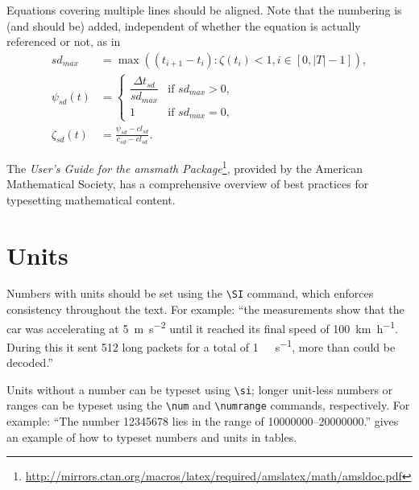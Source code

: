 \documentclass[]{nsm-thesis}
\begin{document}
Equations covering multiple lines should be aligned.
Note that the numbering is (and should be) added, independent of whether the equation is actually referenced or not, as in
\begin{align}
sd_{max} &=
    \max\left(
        (t_{i+1} - t_i)
            : \zeta(t_i) < 1, i \in [0, |T|-1]
    \right)
,\\
\psi_{sd}(t) &=
    \begin{cases}
        \dfrac{\Delta t_{sd}}{sd_{max}}
            & \text{if $sd_{max} > 0$}, \\
        1
            & \text{if $sd_{max} = 0$},
    \end{cases}
\\
\zeta_{sd}(t) &= 
    \frac{
        \psi_{sd} - cl_{sd}
    }{
        c_{sd} - cl_{sd}
    }
.
\end{align}

The \emph{User's Guide for the amsmath Package}\footnote{\url{http://mirrors.ctan.org/macros/latex/required/amslatex/math/amsldoc.pdf}}, provided by the American Mathematical Society, has a comprehensive overview of best practices for typesetting mathematical content.


\clearpage
\section{Units}

Numbers with units should be set using the \verb|\SI| command, which enforces consistency throughout the text.
For example: \enquote{the measurements show that the car was accelerating at \SI{5}{\meter\per\second\squared} until it reached its final speed of \SI{100}{\kilo\meter\per\hour}. During this it sent \SI{512}{\bit} long packets for a total of \SI{1}{\mega\byte\per\second}, more than could be decoded.}


Units without a number can be typeset using \verb|\si|; longer unit-less numbers or ranges can be typeset using the \verb|\num| and \verb|\numrange| commands, respectively.
For example: \enquote{The number \num{12345678} lies in the range of \numrange{10000000}{20000000}.}
 gives an example of how to typeset numbers and units in tables.
\end{document}

